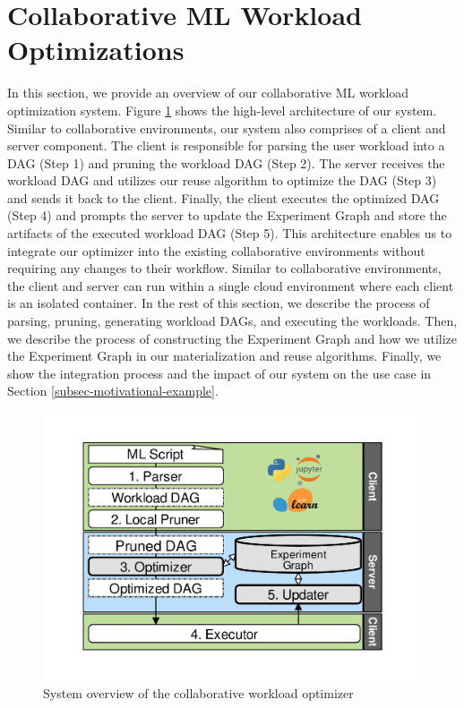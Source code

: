 \section{Collaborative ML Workload Optimizations} \label{sec-ml-workloads}
In this section, we provide an overview of our collaborative ML workload optimization system.
Figure \ref{system-workflow} shows the high-level architecture of our system.
Similar to collaborative environments, our system also comprises of a client and server component.
The client is responsible for parsing the user workload into a DAG (Step 1) and pruning the workload DAG (Step 2).
The server receives the workload DAG and utilizes our reuse algorithm to optimize the DAG (Step 3) and sends it back to the client.
Finally, the client executes the optimized DAG (Step 4) and prompts the server to update the Experiment Graph and store the artifacts of the executed workload DAG (Step 5).
This architecture enables us to integrate our optimizer into the existing collaborative environments without requiring any changes to their workflow.
Similar to collaborative environments, the client and server can run within a single cloud environment where each client is an isolated container.
In the rest of this section, we describe the process of parsing, pruning, generating workload DAGs, and executing the workloads.
Then, we describe the process of constructing the Experiment Graph and how we utilize the Experiment Graph in our materialization and reuse algorithms. 
Finally, we show the integration process and the impact of our system on the use case in Section \ref{subsec-motivational-example}.

\begin{figure}
\centering
\includegraphics[width=0.9\columnwidth]{../images/system-workflow}
\caption{System overview of the collaborative workload optimizer}
\label{system-workflow}
\end{figure}

